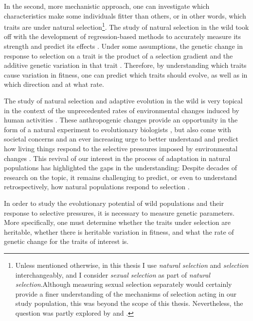 In the second, more mechanistic approach, one can investigate which characteristics make some individuals fitter than others, or in other words, which traits are under natural selection\footnote{Unless mentioned otherwise, in this thesis I use \emph{natural selection} and \emph{selection} interchangeably, and I consider \emph{sexual selection} as part of \emph{natural selection}.Although measuring sexual selection separately would certainly provide a finer understanding of the mechanisms of selection acting in our study population, this was beyond the scope of this thesis. Nevertheless, the question was partly explored by \cite{Garcia-Navas2016} and \cite{Garcia-Navas2015a}.}. The study of natural selection in the wild took off with the development of regression-based methods to accurately measure its strength and predict its effects \parencite{Lande1979, Lande1983}. Under some assumptions, the genetic change in response to selection on a trait is the product of a selection gradient and the additive genetic variation in that trait \parencite{Lush1937}. Therefore, by understanding which traits cause variation in fitness, one can predict which traits should evolve, as well as in which direction and at what rate. 

The study of natural selection and adaptive evolution in the wild is very topical in the context of the unprecedented rates of environmental changes induced by human activities \parencite{parmesan2006}. These anthropogenic changes provide an opportunity in the form of a natural experiment to evolutionary biologists \parencite{Altermatt2016, Brookfield2016}, but also come with societal concerns and an ever increasing urge to better understand and predict how living things respond to the selective pressures imposed by environmental changes \parencite{McCarty2001, Shaw2013}. This revival of our interest in the process of adaptation in natural populations has highlighted the gaps in the understanding: Despite decades of research on the topic, it remains challenging to predict, or even to understand retrospectively, how natural populations respond to selection \parencite{Merila2001, Tafani2013, Shaw2013, Brookfield2016}.

In order to study the evolutionary potential of wild populations and their response to selective pressures, it is necessary to measure genetic parameters. More specifically, one must determine whether the traits under selection are heritable, whether there is heritable variation in fitness, and what the rate of genetic change for the traits of interest is. 

